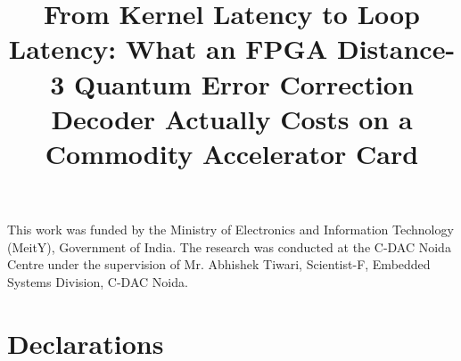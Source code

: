 \documentclass[pdflatex,sn-mathphys-num]{sn-jnl}
\theoremstyle{thmstyleone}
\theoremstyle{thmstyletwo}
\theoremstyle{thmstylethree}
\begin{document}
\title{From Kernel Latency to Loop Latency: What an FPGA Distance-3 Quantum Error Correction Decoder Actually Costs on a Commodity Accelerator Card}

\author*[1]{ }


\abstract{}


\maketitle












\backmatter

This work was funded by the Ministry of Electronics and Information Technology (MeitY), Government of India. The research was conducted at the C-DAC Noida Centre under the supervision of Mr. Abhishek Tiwari, Scientist-F, Embedded Systems Division, C-DAC Noida.

\section*{Declarations}
\end{document}
